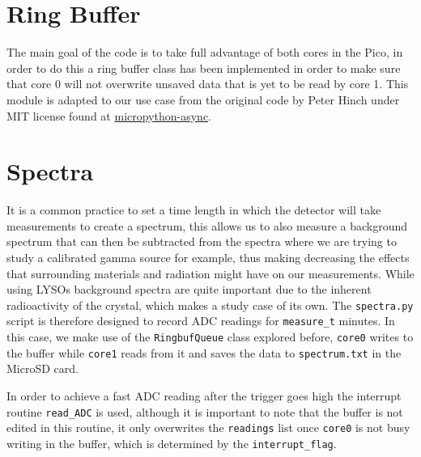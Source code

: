 \newpage


\section{Ring Buffer}

The main goal of the code is to take full advantage of both cores in the Pico, in order to do this a ring buffer class has been implemented in order to make sure that core 0 will not overwrite unsaved data that is yet to be read by core 1. This module is adapted to our use case from the original code by Peter Hinch under MIT license found at \href{https://github.com/peterhinch/micropython-async/blob/master/v3/primitives/ringbuf_queue.py}{micropython-async}.



\section{Spectra}\label{sec:spectra.py}

It is a common practice to set a time length in which the detector will take measurements to create a spectrum, this allows us to also measure a background spectrum that can then be subtracted from the spectra where we are trying to study a calibrated gamma source for example, thus making decreasing the effects that surrounding materials and radiation might have on our measurements. While using LYSOs background spectra are quite important due to the inherent radioactivity of the crystal, which makes a study case of its own. The \texttt{spectra.py} script is therefore designed to record ADC readings for \texttt{measure\_t} minutes. In this case, we make use of the \texttt{RingbufQueue} class explored before, \texttt{core0} writes to the buffer while \texttt{core1} reads from it and saves the data to \texttt{spectrum.txt} in the MicroSD card.

In order to achieve a fast ADC reading after the trigger goes high the interrupt routine \texttt{read\_ADC} is used, although it is important to note that the buffer is not edited in this routine, it only overwrites the \texttt{readings} list once \texttt{core0} is not busy writing in the buffer, which is determined by the \texttt{interrupt\_flag}.



